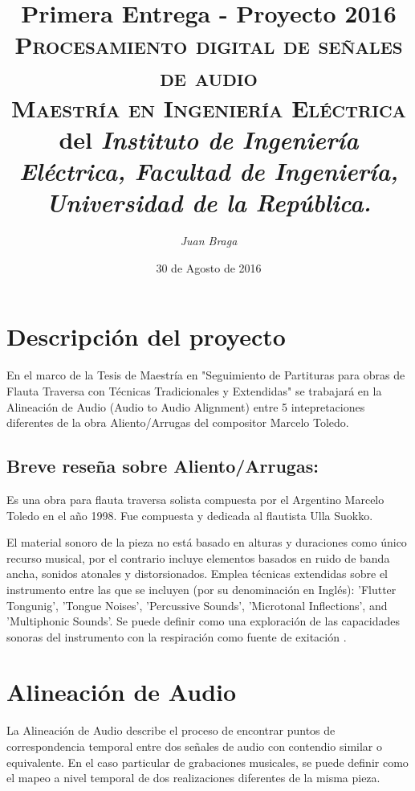 \documentclass{article}
\title{\textbf{Primera Entrega - Proyecto 2016}\\\large \textsc{Procesamiento digital de señales de audio}\\
 \textsc{Maestría en Ingeniería Eléctrica} del \textit{Instituto de Ingeniería Eléctrica, Facultad de Ingeniería, Universidad de la República.}}
\author{\textit{Juan Braga}}
\date{30 de Agosto de 2016}
\begin{document}
\maketitle 


\section*{Descripción del proyecto}
En el marco de la Tesis de Maestría en "Seguimiento de Partituras para obras de Flauta Traversa con Técnicas Tradicionales y Extendidas" se trabajará en la Alineación de Audio (Audio to Audio Alignment) entre 5 intepretaciones diferentes de la obra Aliento/Arrugas del compositor Marcelo Toledo.
\medskip


\subsection*{Breve reseña sobre Aliento/Arrugas:}
\label{aliento}
Es una obra para flauta traversa solista compuesta por el Argentino Marcelo Toledo en el año 1998. Fue compuesta y dedicada al flautista Ulla Suokko. 
\medskip

El material sonoro de la pieza no está basado en alturas y duraciones como único recurso musical, por el contrario incluye elementos basados en ruido de banda ancha, sonidos atonales y distorsionados. Emplea técnicas extendidas sobre el instrumento entre las que se incluyen (por su denominación en Inglés): 'Flutter Tongunig', 'Tongue Noises', 'Percussive Sounds', 'Microtonal Inflections', and 'Multiphonic Sounds'. Se puede definir como una exploración de las capacidades sonoras del instrumento con la respiración como fuente de exitación \cite{candelaria2005argentine}.   

\section*{Alineación de Audio}
La Alineación de Audio describe el proceso de encontrar puntos de correspondencia temporal entre dos señales de audio con contendio similar o equivalente. En el caso particular de grabaciones musicales, se puede definir como el mapeo a nivel temporal de dos realizaciones diferentes de la misma pieza. 
\medskip
\end{document}
